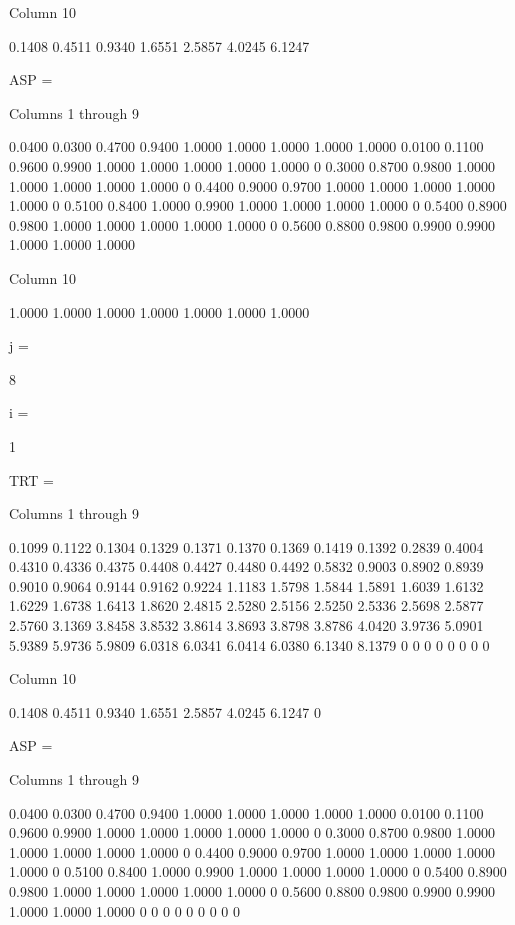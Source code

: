   Column 10

    0.1408
    0.4511
    0.9340
    1.6551
    2.5857
    4.0245
    6.1247


ASP =

  Columns 1 through 9

    0.0400    0.0300    0.4700    0.9400    1.0000    1.0000    1.0000    1.0000    1.0000
    0.0100    0.1100    0.9600    0.9900    1.0000    1.0000    1.0000    1.0000    1.0000
         0    0.3000    0.8700    0.9800    1.0000    1.0000    1.0000    1.0000    1.0000
         0    0.4400    0.9000    0.9700    1.0000    1.0000    1.0000    1.0000    1.0000
         0    0.5100    0.8400    1.0000    0.9900    1.0000    1.0000    1.0000    1.0000
         0    0.5400    0.8900    0.9800    1.0000    1.0000    1.0000    1.0000    1.0000
         0    0.5600    0.8800    0.9800    0.9900    0.9900    1.0000    1.0000    1.0000

  Column 10

    1.0000
    1.0000
    1.0000
    1.0000
    1.0000
    1.0000
    1.0000


j =

     8


i =

     1


TRT =

  Columns 1 through 9

    0.1099    0.1122    0.1304    0.1329    0.1371    0.1370    0.1369    0.1419    0.1392
    0.2839    0.4004    0.4310    0.4336    0.4375    0.4408    0.4427    0.4480    0.4492
    0.5832    0.9003    0.8902    0.8939    0.9010    0.9064    0.9144    0.9162    0.9224
    1.1183    1.5798    1.5844    1.5891    1.6039    1.6132    1.6229    1.6738    1.6413
    1.8620    2.4815    2.5280    2.5156    2.5250    2.5336    2.5698    2.5877    2.5760
    3.1369    3.8458    3.8532    3.8614    3.8693    3.8798    3.8786    4.0420    3.9736
    5.0901    5.9389    5.9736    5.9809    6.0318    6.0341    6.0414    6.0380    6.1340
    8.1379         0         0         0         0         0         0         0         0

  Column 10

    0.1408
    0.4511
    0.9340
    1.6551
    2.5857
    4.0245
    6.1247
         0


ASP =

  Columns 1 through 9

    0.0400    0.0300    0.4700    0.9400    1.0000    1.0000    1.0000    1.0000    1.0000
    0.0100    0.1100    0.9600    0.9900    1.0000    1.0000    1.0000    1.0000    1.0000
         0    0.3000    0.8700    0.9800    1.0000    1.0000    1.0000    1.0000    1.0000
         0    0.4400    0.9000    0.9700    1.0000    1.0000    1.0000    1.0000    1.0000
         0    0.5100    0.8400    1.0000    0.9900    1.0000    1.0000    1.0000    1.0000
         0    0.5400    0.8900    0.9800    1.0000    1.0000    1.0000    1.0000    1.0000
         0    0.5600    0.8800    0.9800    0.9900    0.9900    1.0000    1.0000    1.0000
         0         0         0         0         0         0         0         0         0

